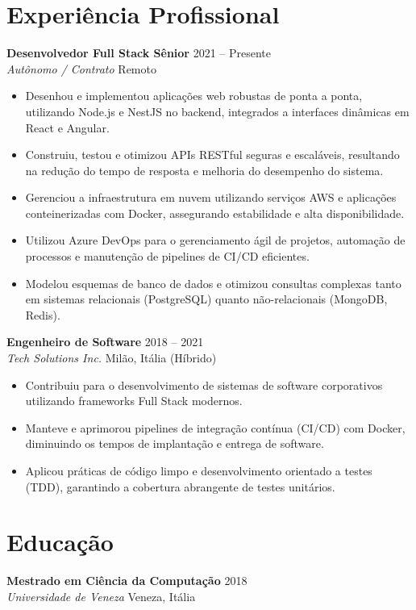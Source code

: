 \documentclass[11pt,a4paper]{article}
\begin{document}
\section*{Experiência Profissional}
\noindent
\textbf{Desenvolvedor Full Stack Sênior} \hfill 2021 -- Presente \\
\textit{Autônomo / Contrato} \hfill Remoto
\begin{itemize}[leftmargin=*]
    \item Desenhou e implementou aplicações web robustas de ponta a ponta, utilizando Node.js e NestJS no backend, integrados a interfaces dinâmicas em React e Angular.
    \item Construiu, testou e otimizou APIs RESTful seguras e escaláveis, resultando na redução do tempo de resposta e melhoria do desempenho do sistema.
    \item Gerenciou a infraestrutura em nuvem utilizando serviços AWS e aplicações conteinerizadas com Docker, assegurando estabilidade e alta disponibilidade.
    \item Utilizou Azure DevOps para o gerenciamento ágil de projetos, automação de processos e manutenção de pipelines de CI/CD eficientes.
    \item Modelou esquemas de banco de dados e otimizou consultas complexas tanto em sistemas relacionais (PostgreSQL) quanto não-relacionais (MongoDB, Redis).
\end{itemize}

\vspace{2mm}
\noindent
\textbf{Engenheiro de Software} \hfill 2018 -- 2021 \\
\textit{Tech Solutions Inc.} \hfill Milão, Itália (Híbrido)
\begin{itemize}[leftmargin=*]
    \item Contribuiu para o desenvolvimento de sistemas de software corporativos utilizando frameworks Full Stack modernos.
    \item Manteve e aprimorou pipelines de integração contínua (CI/CD) com Docker, diminuindo os tempos de implantação e entrega de software.
    \item Aplicou práticas de código limpo e desenvolvimento orientado a testes (TDD), garantindo a cobertura abrangente de testes unitários.
\end{itemize}

\section*{Educação}
\noindent
\textbf{Mestrado em Ciência da Computação} \hfill 2018 \\
\textit{Universidade de Veneza} \hfill Veneza, Itália
\end{document}
